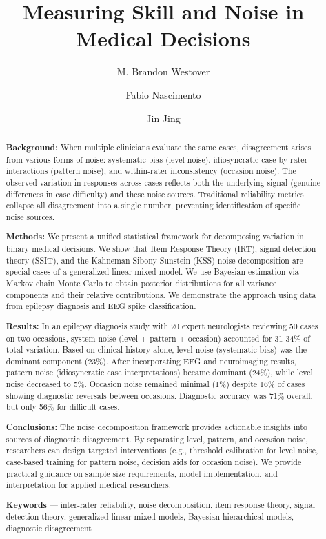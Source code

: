 \documentclass[num-refs]{wiley-article}
\title{Measuring Skill and Noise in Medical Decisions}
\author[1]{M. Brandon Westover}
\affil[1]{Harvard Medical School}
\author[2]{Fabio Nascimento}
\affil[2]{Washington University School of Medicine in St. Louis}
\author[1]{Jin Jing}
\affil[1]{Harvard Medical School}
\begin{document}
\maketitle
{}
\begin{abstract}
\textbf{Background:} When multiple clinicians evaluate the same cases, disagreement arises from various forms of noise: systematic bias (level noise), idiosyncratic case-by-rater interactions (pattern noise), and within-rater inconsistency (occasion noise). The observed variation in responses across cases reflects both the underlying signal (genuine differences in case difficulty) and these noise sources. Traditional reliability metrics collapse all disagreement into a single number, preventing identification of specific noise sources.

\textbf{Methods:} We present a unified statistical framework for decomposing variation in binary medical decisions. We show that Item Response Theory (IRT), signal detection theory (SSIT), and the Kahneman-Sibony-Sunstein (KSS) noise decomposition are special cases of a generalized linear mixed model. We use Bayesian estimation via Markov chain Monte Carlo to obtain posterior distributions for all variance components and their relative contributions. We demonstrate the approach using data from epilepsy diagnosis and EEG spike classification.

\textbf{Results:} In an epilepsy diagnosis study with 20 expert neurologists reviewing 50 cases on two occasions, system noise (level + pattern + occasion) accounted for 31-34\% of total variation. Based on clinical history alone, level noise (systematic bias) was the dominant component (23\%). After incorporating EEG and neuroimaging results, pattern noise (idiosyncratic case interpretations) became dominant (24\%), while level noise decreased to 5\%. Occasion noise remained minimal (1\%) despite 16\% of cases showing diagnostic reversals between occasions. Diagnostic accuracy was 71\% overall, but only 56\% for difficult cases.

\textbf{Conclusions:} The noise decomposition framework provides actionable insights into sources of diagnostic disagreement. By separating level, pattern, and occasion noise, researchers can design targeted interventions (e.g., threshold calibration for level noise, case-based training for pattern noise, decision aids for occasion noise). We provide practical guidance on sample size requirements, model implementation, and interpretation for applied medical researchers.

\textbf{Keywords} --- inter-rater reliability, noise decomposition, item response theory, signal detection theory, generalized linear mixed models, Bayesian hierarchical models, diagnostic disagreement%
\end{abstract}%
\end{document}
